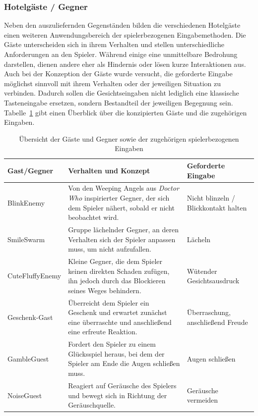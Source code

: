\documentclass[intern]{cgMA}
\begin{document}
\subsubsection{Hotelgäste / Gegner}
Neben den auszuliefernden Gegenständen bilden die verschiedenen Hotelgäste einen weiteren Anwendungsbereich der spielerbezogenen Eingabemethoden. Die Gäste unterscheiden sich in ihrem Verhalten und stellen unterschiedliche Anforderungen an den Spieler. Während einige eine unmittelbare Bedrohung darstellen, dienen andere eher als Hindernis oder lösen kurze Interaktionen aus.\\
Auch bei der Konzeption der Gäste wurde versucht, die geforderte Eingabe möglichst sinnvoll mit ihrem Verhalten oder der jeweiligen Situation zu verbinden. Dadurch sollen die Gesichtseingaben nicht lediglich eine klassische Tasteneingabe ersetzen, sondern Bestandteil der jeweiligen Begegnung sein. 
Tabelle~\ref{tab:gaeste_gegner} gibt einen Überblick über die konzipierten Gäste und die zugehörigen Eingaben. 
\begin{table}[H]
    \centering
    \caption{Übersicht der Gäste und Gegner sowie der zugehörigen spielerbezogenen Eingaben}
    \label{tab:gaeste_gegner}
    \begin{tabularx}{\textwidth}{l X X}
        \hline
        \textbf{Gast/Gegner} & \textbf{Verhalten und Konzept} & \textbf{Geforderte Eingabe} \\
        \hline

        BlinkEnemy &
        Von den Weeping Angels aus \textit{Doctor Who} \cite{doctorwhoWeepingAngels} inspirierter Gegner, der sich dem Spieler nähert, sobald er nicht beobachtet wird. &
        Nicht blinzeln / Blickkontakt halten \\

        SmileSwarm &
        Gruppe lächelnder Gegner, an deren Verhalten sich der Spieler anpassen muss, um nicht aufzufallen. &
        Lächeln \\

        CuteFluffyEnemy &
        Kleine Gegner, die dem Spieler keinen direkten Schaden zufügen, ihn jedoch durch das Blockieren seines Weges behindern. &
        Wütender Gesichtsausdruck \\

        Geschenk-Gast &
        Überreicht dem Spieler ein Geschenk und erwartet zunächst eine überraschte und anschließend eine erfreute Reaktion. &
        Überraschung, anschließend Freude \\

        GambleGuest &
        Fordert den Spieler zu einem Glücksspiel heraus, bei dem der Spieler am Ende die Augen schließen muss. &
        Augen schließen \\

        NoiseGuest &
        Reagiert auf Geräusche des Spielers und bewegt sich in Richtung der Geräuschquelle. &
        Geräusche vermeiden \\
        \hline
    \end{tabularx}
\end{table}
\end{document}

